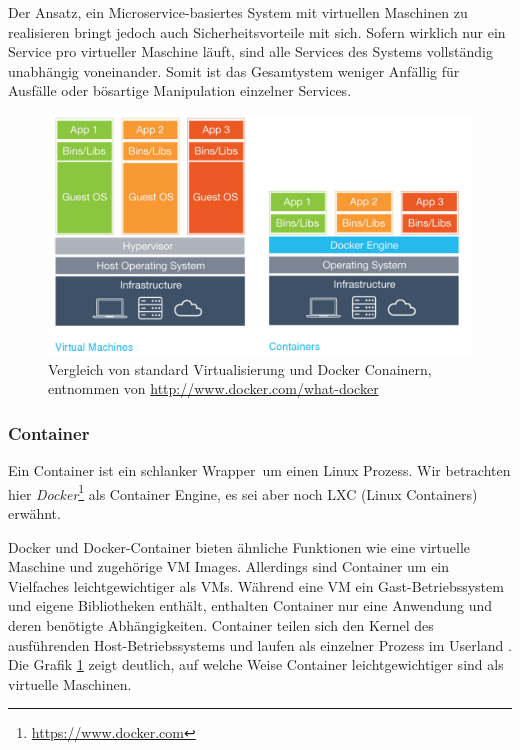Der Ansatz, ein Microservice-basiertes System mit virtuellen Maschinen zu realisieren bringt jedoch auch Sicherheitsvorteile mit sich. Sofern wirklich nur ein Service pro virtueller Maschine läuft, sind alle Services des Systems vollständig unabhängig voneinander. Somit ist das Gesamtystem weniger Anfällig für Ausfälle oder bösartige Manipulation einzelner Services.

\begin{figure}[h]
    \centering
    \includegraphics[scale=0.3]{img/container-vm.pdf}
    \caption{Vergleich von standard Virtualisierung und Docker Conainern, entnommen von \url{http://www.docker.com/what-docker}}
    \label{fig:container-vm}
\end{figure}

\subsubsection{Container}
Ein Container ist ein schlanker \glqq Wrapper\grqq\ um einen Linux Prozess. Wir betrachten hier \textit{Docker}\footnote{\url{https://www.docker.com}} als Container Engine, es sei aber noch LXC (Linux Containers) erwähnt.

Docker und Docker-Container bieten ähnliche Funktionen wie eine virtuelle Maschine und zugehörige VM Images. Allerdings sind Container um ein Vielfaches leichtgewichtiger als VMs. Während eine VM ein Gast-Betriebssystem und eigene Bibliotheken enthält, enthalten Container nur eine Anwendung und deren benötigte Abhängigkeiten. Container teilen sich den Kernel des ausführenden Host-Betriebssystems und laufen als einzelner Prozess im Userland \cite{newman2015}. Die Grafik \ref{fig:container-vm} zeigt deutlich, auf welche Weise Container leichtgewichtiger sind als virtuelle Maschinen.

